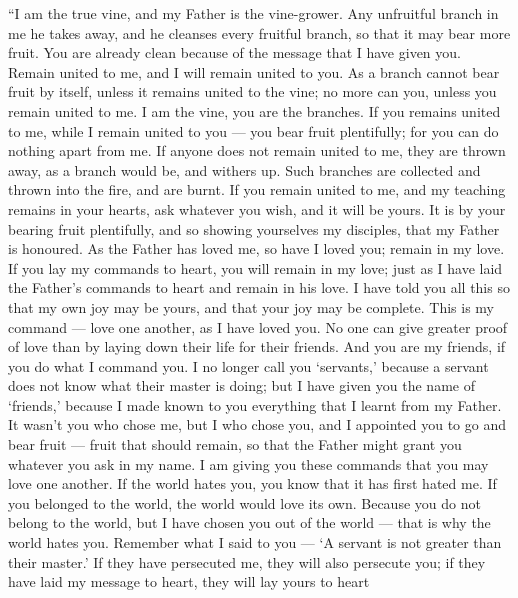  ``I am the true vine, and my Father is the vine-grower.
 Any unfruitful branch in me he takes away, and he cleanses
every fruitful branch, so that it may bear more fruit.  You
are already clean because of the message that I have given you.
 Remain united to me, and I will remain united to you. As a
branch cannot bear fruit by itself, unless it remains united to the
vine; no more can you, unless you remain united to me.  I am
the vine, you are the branches. If you remains united to me, while I
remain united to you --- you bear fruit plentifully; for you can do
nothing apart from me.  If anyone does not remain united to
me, they are thrown away, as a branch would be, and withers up. Such
branches are collected and thrown into the fire, and are burnt.
 If you remain united to me, and my teaching remains in your
hearts, ask whatever you wish, and it will be yours.  It is
by your bearing fruit plentifully, and so showing yourselves my
disciples, that my Father is honoured.  As the Father has
loved me, so have I loved you; remain in my love.  If you
lay my commands to heart, you will remain in my love; just as I have
laid the Father's commands to heart and remain in his love.
 I have told you all this so that my own joy may be yours,
and that your joy may be complete.  This is my command ---
love one another, as I have loved you.  No one can give
greater proof of love than by laying down their life for their friends.
 And you are my friends, if you do what I command you.
 I no longer call you `servants,' because a servant does
not know what their master is doing; but I have given you the name of
`friends,' because I made known to you everything that I learnt from my
Father.  It wasn't you who chose me, but I who chose you,
and I appointed you to go and bear fruit --- fruit that should remain,
so that the Father might grant you whatever you ask in my name.
 I am giving you these commands that you may love one
another.  If the world hates you, you know that it has
first hated me.  If you belonged to the world, the world
would love its own. Because you do not belong to the world, but I have
chosen you out of the world --- that is why the world hates you.
 Remember what I said to you --- `A servant is not greater
than their master.' If they have persecuted me, they will also persecute
you; if they have laid my message to heart, they will lay yours to heart
